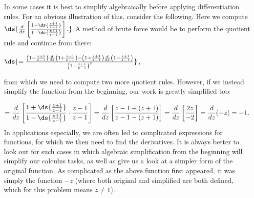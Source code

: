 In some cases it is best to simplify algebraically
before applying differentiation rules.  For an obvious 
illustration of this, 
consider the following.
\bex Here we compute $\ds{\frac{d}{dz}\left[\frac{1+\ds{\frac{z+1}{z-1}}}
{1-\ds{\frac{z+1}{z-1}}}
\right].}$
A method of brute force would be to perform the quotient rule
and continue from there:

\qquad$\ds{=\frac{\left(1-\frac{z+1}{z-1}\right)\frac{d}{dz}
\left(1+\frac{z+1}{z-1}\right)-\left(1+\frac{z+1}{z-1}\right)
\frac{d}{dz}\left(1-\frac{z+1}{z-1}\right)}{\left(1-
\frac{z+1}{z-1}\right)^2}}$,

\noindent from which we need to compute two more quotient
rules.  However, if we instead simplify the function
from the beginning, our work is greatly simplified too:

$$
=\frac{d}{dz}\left[\frac{1+\ds{\frac{z+1}{z-1}}}{1-\ds{\frac{z+1}{z-1}}}
\cdot\frac{z-1}{z-1}\right]
=\frac{d}{dz}\left[\frac{z-1+(z+1)}{z-1-(z+1)}  \right]
=\frac{d}{dz}\left[\frac{2z}{-2}\right]=\frac{d}{dz}(-z)=-1.
$$\eex
In applications especially, we are often led to 
complicated expressions for functions, for which
we then need to find the derivatives.  It is always better
to look out for such cases in which algebraic simplification
from the beginning will simplify our calculus tasks,
as well as give us a look at a simpler form of the original
function.  As complicated as the above function first
appeared, it was simply the function $-z$ (where both 
original and simplified are both defined, which for this
problem means $z\ne1$).



